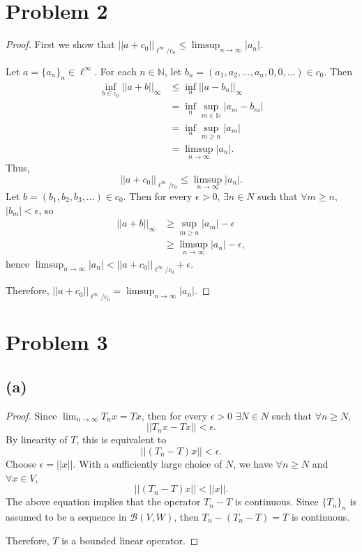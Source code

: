 \documentclass{article}
\newcommand{\N}{\mathbb{N}} %
\begin{document}
\section*{Problem 2}
\begin{proof}
	First we show that $||a + c_0||_{\ell^{\infty} / c_0} \leq \limsup_{n \to \infty} |a_n|$.
	
	Let $a = \{a_n\}_n \in \ell^{\infty}$. For each $n \in \N$, let $b_n = (a_1, a_2, ..., a_n, 0, 0, ...) \in c_0$. Then 
	\begin{align}
		\inf_{b \in c_0} ||a + b||_{\infty} & \leq \inf_n ||a - b_n||_{\infty} \\
		&= \inf_n \sup_{m \in \N} |a_m - b_m| \\
		&= \inf_n \sup_{m \geq n} |a_m| \\
		&= \limsup_{n \to \infty} |a_n|.
	\end{align}
	Thus, 
	\begin{equation}
		||a + c_0||_{\ell^{\infty} / c_0} \leq \limsup_{n \to \infty} |a_n|.
	\end{equation}
	Let $b = (b_1, b_2, b_3, ...) \in c_0$. Then for every $\epsilon > 0$, $\exists n \in N$ such that $\forall m \geq n$, $|b_m| < \epsilon$, so 
	\begin{align}
		||a + b||_{\infty} & \geq \sup_{m \geq n}|a_m| - \epsilon \\
		&\geq \limsup_{n \to \infty} |a_n| - \epsilon,
	\end{align}
	hence $\limsup_{n \to \infty}|a_n| < ||a + c_0||_{\ell^{\infty}/c_0} + \epsilon$.
	
	Therefore, $||a + c_0||_{\ell^{\infty} / c_0} = \limsup_{n \to \infty} |a_n|$.
\end{proof}
\section*{Problem 3}
\subsection*{(a)}
\begin{proof}
	Since $\lim_{n \to \infty}T_n x = Tx$, then for every $\epsilon > 0$ $\exists N \in N$ such that $\forall n \geq N$,
	\begin{equation}
		||T_nx - Tx|| < \epsilon.
	\end{equation}
	By linearity of $T$, this is equivalent to 
	\begin{equation}
		||(T_n - T)x|| < \epsilon.
	\end{equation}
	Choose $\epsilon = ||x||$. With a sufficiently large choice of $N$, we have $\forall n \geq N$ and $\forall x \in V$,
	\begin{equation}
		||(T_n - T)x|| < ||x||.
	\end{equation}
	The above equation implies that the operator $T_n - T$ is continuous. Since $\{T_n\}_n$ is assumed to be a sequence in $\mathcal{B}(V, W)$, then $T_n - (T_n - T) = T$ is continuous.
	
	Therefore, $T$ is a bounded linear operator.
\end{proof}
\end{document}
